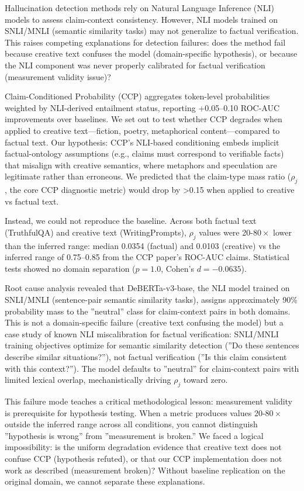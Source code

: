 
Hallucination detection methods rely on Natural Language Inference (NLI) models to assess claim-context consistency. However, NLI models trained on SNLI/MNLI (semantic similarity tasks) may not generalize to factual verification. This raises competing explanations for detection failures: does the method fail because creative text confuses the model (domain-specific hypothesis), or because the NLI component was never properly calibrated for factual verification (measurement validity issue)?

Claim-Conditioned Probability (CCP) aggregates token-level probabilities weighted by NLI-derived entailment status, reporting +0.05--0.10 ROC-AUC improvements over baselines. We set out to test whether CCP degrades when applied to creative text---fiction, poetry, metaphorical content---compared to factual text. Our hypothesis: CCP's NLI-based conditioning embeds implicit factual-ontology assumptions (e.g., claims must correspond to verifiable facts) that misalign with creative semantics, where metaphors and speculation are legitimate rather than erroneous. We predicted that the claim-type mass ratio ($\rho_j$, the core CCP diagnostic metric) would drop by >0.15 when applied to creative vs factual text.

Instead, we could not reproduce the baseline. Across both factual text (TruthfulQA) and creative text (WritingPrompts), $\rho_j$ values were 20-$80\times$ lower than the inferred range: median 0.0354 (factual) and 0.0103 (creative) vs the inferred range of 0.75--0.85 from the CCP paper's ROC-AUC claims. Statistical tests showed no domain separation ($p = 1.0$, Cohen's $d = -0.0635$).

Root cause analysis revealed that DeBERTa-v3-base, the NLI model trained on SNLI/MNLI (sentence-pair semantic similarity tasks), assigns approximately 90\% probability mass to the ''neutral'' class for claim-context pairs in both domains. This is not a domain-specific failure (creative text confusing the model) but a case study of known NLI miscalibration for factual verification: SNLI/MNLI training objectives optimize for semantic similarity detection (''Do these sentences describe similar situations?''), not factual verification (''Is this claim consistent with this context?''). The model defaults to ''neutral'' for claim-context pairs with limited lexical overlap, mechanistically driving $\rho_j$ toward zero.

This failure mode teaches a critical methodological lesson: measurement validity is prerequisite for hypothesis testing. When a metric produces values 20-$80\times$ outside the inferred range across all conditions, you cannot distinguish ''hypothesis is wrong'' from ''measurement is broken.'' We faced a logical impossibility: is the uniform degradation evidence that creative text does not confuse CCP (hypothesis refuted), or that our CCP implementation does not work as described (measurement broken)? Without baseline replication on the original domain, we cannot separate these explanations.

